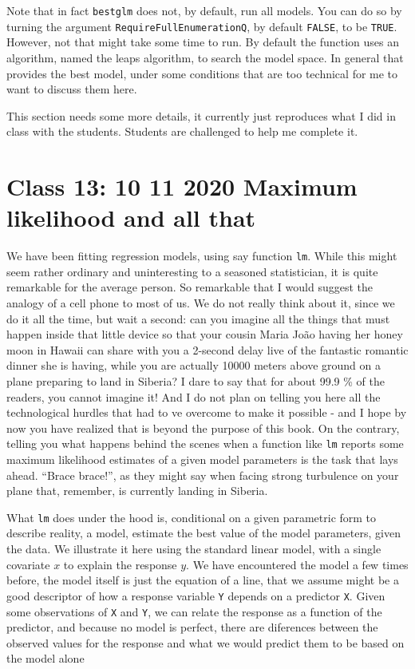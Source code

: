 \documentclass[
]{book}
\begin{document}
Note that in fact \texttt{bestglm} does not, by default, run all models. You can do so by turning the argument \texttt{RequireFullEnumerationQ}, by default \texttt{FALSE}, to be \texttt{TRUE}. However, not that might take some time to run. By default the function uses an algorithm, named the leaps algorithm, to search the model space. In general that provides the best model, under some conditions that are too technical for me to want to discuss them here.

This section needs some more details, it currently just reproduces what I did in class with the students. Students are challenged to help me complete it.

\hypertarget{MLEs}{%
\chapter{Class 13: 10 11 2020 Maximum likelihood and all that}\label{MLEs}}

We have been fitting regression models, using say function \texttt{lm}. While this might seem rather ordinary and uninteresting to a seasoned statistician, it is quite remarkable for the average person. So remarkable that I would suggest the analogy of a cell phone to most of us. We do not really think about it, since we do it all the time, but wait a second: can you imagine all the things that must happen inside that little device so that your cousin Maria João having her honey moon in Hawaii can share with you a 2-second delay live of the fantastic romantic dinner she is having, while you are actually 10000 meters above ground on a plane preparing to land in Siberia? I dare to say that for about 99.9 \% of the readers, you cannot imagine it! And I do not plan on telling you here all the technological hurdles that had to ve overcome to make it possible - and I hope by now you have realized that is beyond the purpose of this book. On the contrary, telling you what happens behind the scenes when a function like \texttt{lm} reports some maximum likelihood estimates of a given model parameters is the task that lays ahead. ``Brace brace!'', as they might say when facing strong turbulence on your plane that, remember, is currently landing in Siberia.

What \texttt{lm} does under the hood is, conditional on a given parametric form to describe reality, a model, estimate the best value of the model parameters, given the data. We illustrate it here using the standard linear model, with a single covariate \(x\) to explain the response \(y\). We have encountered the model a few times before, the model itself is just the equation of a line, that we assume might be a good descriptor of how a response variable \texttt{Y} depends on a predictor \texttt{X}. Given some observations of \texttt{X} and \texttt{Y}, we can relate the response as a function of the predictor, and because no model is perfect, there are diferences between the observed values for the response and what we would predict them to be based on the model alone
\end{document}
